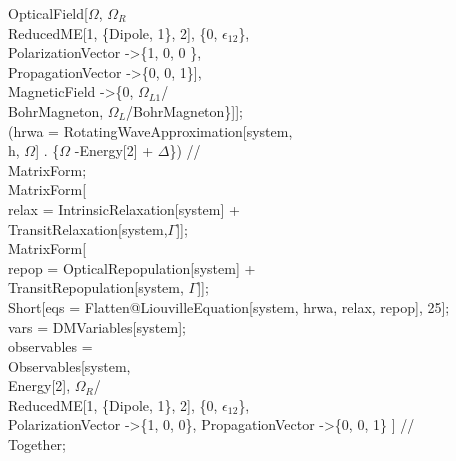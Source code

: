 \begin{enumerate}
     OpticalField[$\Omega$, $\Omega_R$ \\
       ReducedME[1, \{Dipole, 1\}, 2], \{0, $\epsilon_{12}$\}, \\
      PolarizationVector -\textgreater \{1, 0, 0 \}, \\
      PropagationVector -\textgreater \{0, 0, 1\}], \\
    MagneticField -\textgreater \{0, $\Omega_{L1}$/ \\
       BohrMagneton, $\Omega_L$/BohrMagneton\}]]; \\
(hrwa = RotatingWaveApproximation[system, \\
      h, $\Omega$] . \{$\Omega$ -\rbrack Energy[2] + $\Delta$\}) // \\
  MatrixForm; \\
MatrixForm[ \\
  relax = IntrinsicRelaxation[system] + \\
    TransitRelaxation[system,$\Gamma$]];\\
MatrixForm[\\
  repop = OpticalRepopulation[system] + \\
    TransitRepopulation[system, $\Gamma$]];\\
Short[eqs = Flatten@LiouvilleEquation[system, hrwa, relax, repop], 25];\\
vars = DMVariables[system];\\
observables = \\
  Observables[system, \\
    Energy[2], $\Omega_R$/ \\
     ReducedME[1, \{Dipole, 1\}, 2], \{0, $\epsilon_{12}$\}, \\
    PolarizationVector -\textgreater \{1, 0, 0\}, PropagationVector -\textgreater \{0, 0, 1\} ] // \\
    Together;\\


\end{enumerate}
